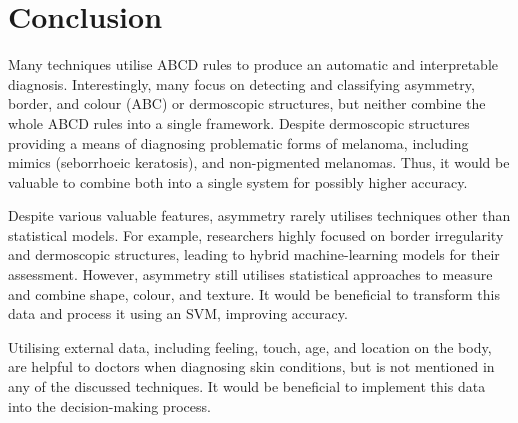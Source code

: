 \section{Conclusion}
Many techniques utilise ABCD rules to produce an automatic and interpretable diagnosis. Interestingly, many focus on detecting and classifying asymmetry, border, and colour (ABC) or dermoscopic structures, but neither combine the whole ABCD rules into a single framework. Despite dermoscopic structures providing a means of diagnosing problematic forms of melanoma, including mimics (seborrhoeic keratosis)\cite{Izikson2002}, and non-pigmented melanomas. Thus, it would be valuable to combine both into a single system for possibly higher accuracy.

Despite various valuable features, asymmetry rarely utilises techniques other than statistical models. For example, researchers highly focused on border irregularity and dermoscopic structures, leading to hybrid machine-learning models for their assessment. However, asymmetry still utilises statistical approaches to measure and combine shape, colour, and texture. It would be beneficial to transform this data and process it using an SVM, improving accuracy.

Utilising external data, including feeling, touch, age, and location on the body, are helpful to doctors when diagnosing skin conditions, but is not mentioned in any of the discussed techniques. It would be beneficial to implement this data into the decision-making process.
